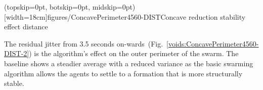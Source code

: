 \documentclass{ieeeaccess}
\begin{document}
\Figure[t!](topskip=0pt, botskip=0pt, midskip=0pt)[width=18cm]{figures/ConcavePerimeter4560-DIST}{Concave reduction stability effect distance\label{voids:ConcavePerimeter4560-DIST}}

The residual jitter from 3.5 seconds on-wards~(Fig.~\ref{voids:ConcavePerimeter4560-DIST-2}) is the algorithm's effect on the outer perimeter of the swarm. The baseline shows a steadier average with a reduced variance as the basic swarming algorithm allows the agents to settle to a formation that is more structurally stable.
\end{document}
